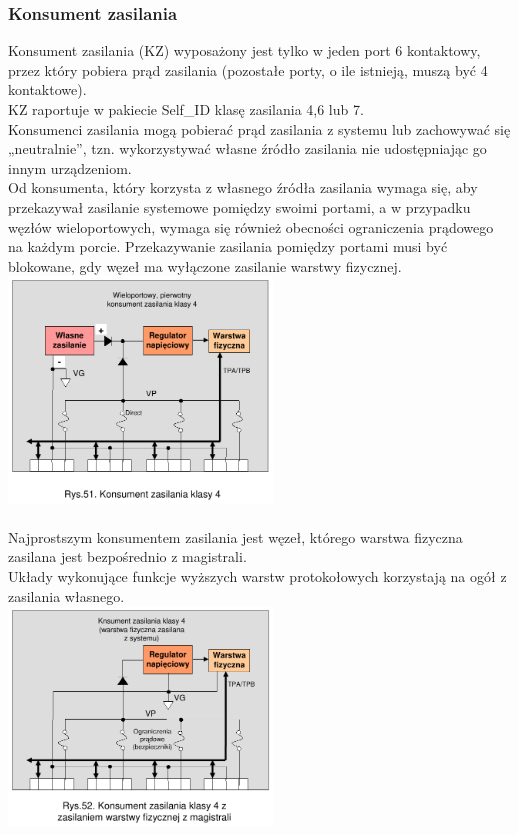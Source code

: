 \subsubsection{Konsument zasilania}
Konsument zasilania (KZ) wyposażony jest tylko w jeden port 6 kontaktowy, przez który pobiera prąd zasilania (pozostałe porty, o ile istnieją, muszą być 4 kontaktowe).\\
KZ raportuje w pakiecie Self\_ID klasę zasilania 4,6 lub 7.\\
Konsumenci zasilania mogą pobierać prąd zasilania z systemu lub zachowywać się „neutralnie”, tzn. wykorzystywać własne źródło zasilania nie udostępniając go innym urządzeniom.\\
Od konsumenta, który korzysta z własnego źródła zasilania wymaga się, aby przekazywał zasilanie systemowe pomiędzy swoimi portami, a w przypadku węzłów wieloportowych, wymaga się również obecności ograniczenia prądowego na każdym porcie. Przekazywanie zasilania pomiędzy portami musi być blokowane, gdy węzeł ma wyłączone zasilanie warstwy fizycznej.\\
\includegraphics[width=7cm]{./wyklady/FIREWIRE_68_1.pdf}\\\\
Najprostszym konsumentem zasilania jest węzeł, którego warstwa fizyczna zasilana jest bezpośrednio z magistrali.\\
Układy wykonujące funkcje wyższych warstw protokołowych korzystają na ogół z zasilania własnego.\\
\includegraphics[width=7cm]{./wyklady/FIREWIRE_69_1.pdf}

